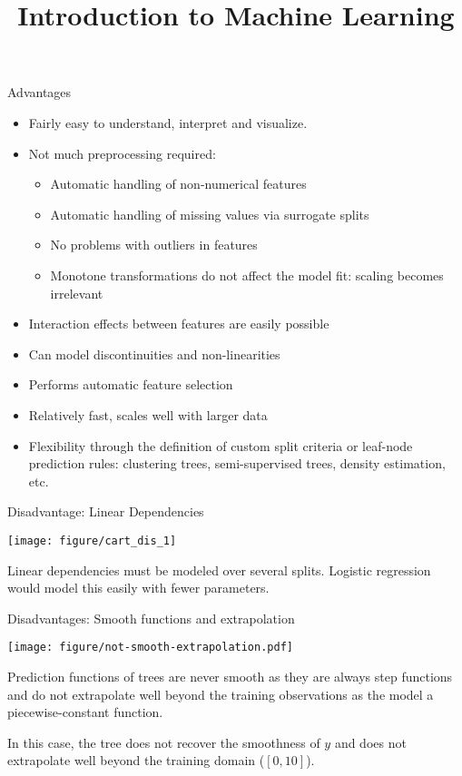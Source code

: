 \documentclass[11pt,compress,t,notes=noshow, xcolor=table]{beamer}
\title{Introduction to Machine Learning}
\institute{\href{https://compstat-lmu.github.io/lecture_i2ml/}{compstat-lmu.github.io/lecture\_i2ml}}
\date{}
\begin{document}

\sloppy

\begin{vbframe}{Advantages}
  \begin{itemize}
    \item Fairly easy to understand, interpret and visualize.
    \item Not much preprocessing required:
    \begin{itemize}
      \item Automatic handling of non-numerical features
      \item Automatic handling of missing values via surrogate splits
      \item No problems with outliers in features
      \item Monotone transformations do not affect the model fit: scaling becomes irrelevant
    \end{itemize}
    \item Interaction effects between features are easily possible
    \item Can model discontinuities and non-linearities
    \item Performs automatic feature selection
    \item Relatively fast, scales well with larger data
    \item Flexibility through the definition of custom split criteria or leaf-node prediction rules: clustering trees, semi-supervised trees, density estimation, etc.
    \end{itemize}
\end{vbframe}

\begin{vbframe}{Disadvantage: Linear Dependencies}

{\centering \texttt{[image: figure/cart\_dis\_1]} 

}


Linear dependencies must be modeled over several splits. 
Logistic regression would model this easily with fewer parameters.
\end{vbframe}

\begin{vbframe}{Disadvantages: Smooth functions and extrapolation}


{\centering \texttt{[image: figure/not-smooth-extrapolation.pdf]} 

}

Prediction functions of trees are never smooth as they are always step functions and do not extrapolate well beyond the training observations as the model a piecewise-constant function.

In this case, the tree does not recover the smoothness of $y$ and does not extrapolate well beyond the training domain ($[0, 10]$).
\end{vbframe}
\end{document}
